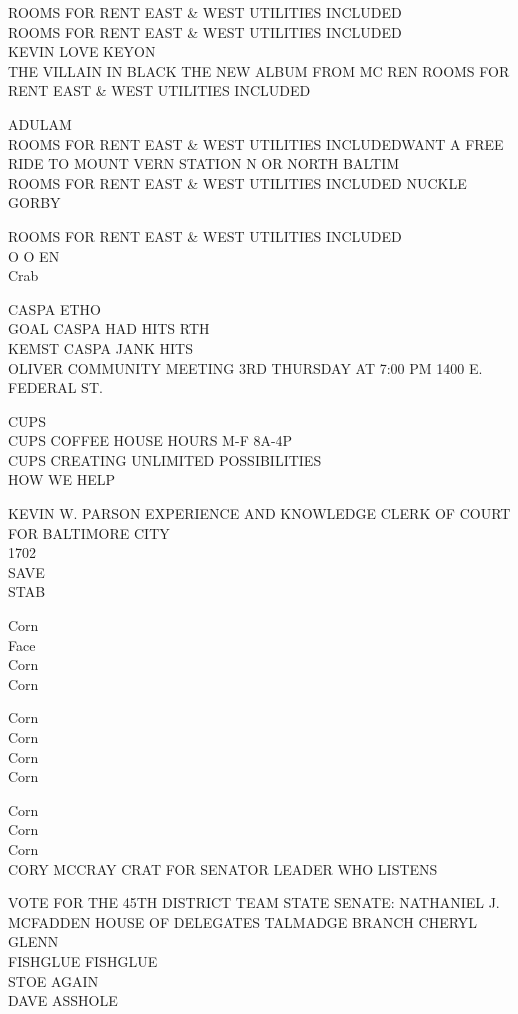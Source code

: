 \documentclass[10pt,letterpaper]{article}
\begin{document}
ROOMS FOR RENT EAST \& WEST UTILITIES INCLUDED\\
ROOMS FOR RENT EAST \& WEST UTILITIES INCLUDED\\
KEVIN LOVE KEYON\\
THE VILLAIN IN BLACK THE NEW ALBUM FROM MC REN ROOMS FOR RENT EAST \& WEST UTILITIES INCLUDED

ADULAM\\
ROOMS FOR RENT EAST \& WEST UTILITIES INCLUDEDWANT A FREE RIDE TO MOUNT VERN STATION N OR NORTH BALTIM\\
ROOMS FOR RENT EAST \& WEST UTILITIES INCLUDED NUCKLE\\
GORBY

ROOMS FOR RENT EAST \& WEST UTILITIES INCLUDED\\
O O EN\\
Crab

CASPA ETHO\\
GOAL CASPA HAD HITS RTH\\
KEMST CASPA JANK HITS\\
OLIVER COMMUNITY MEETING 3RD THURSDAY AT 7:00 PM 1400 E. FEDERAL ST.

CUPS\\
CUPS COFFEE HOUSE HOURS M{-}F 8A{-}4P\\
CUPS CREATING UNLIMITED POSSIBILITIES\\
HOW WE HELP

KEVIN W. PARSON EXPERIENCE AND KNOWLEDGE CLERK OF COURT FOR BALTIMORE CITY\\
1702\\
SAVE\\
STAB

Corn\\
Face\\
Corn\\
Corn

Corn\\
Corn\\
Corn\\
Corn

Corn\\
Corn\\
Corn\\
CORY MCCRAY CRAT FOR SENATOR LEADER WHO LISTENS

VOTE FOR THE 45TH DISTRICT TEAM STATE SENATE: NATHANIEL J. MCFADDEN HOUSE OF DELEGATES TALMADGE BRANCH CHERYL GLENN\\
FISHGLUE FISHGLUE\\
STOE AGAIN\\
DAVE ASSHOLE
\end{document}

